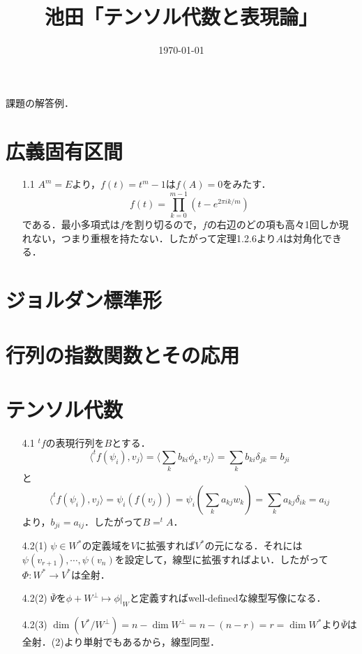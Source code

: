 \documentclass[a4paper,10pt,uplatex]{jsarticle}
\newcommand{\transpose}[1]{^t\! #1}
\numberwithin{equation}{section}
\theoremstyle{mystyle}
\begin{document}
\title{池田「テンソル代数と表現論」}
\author{}
\date{\today}
\maketitle

課題の解答例．
\section{広義固有区間}
\begin{itemize}
    \item[1.1] $A^m = E$より，$f(t) = t^m - 1$は$f(A) = 0$をみたす．
    \begin{equation}
        f(t) = \prod_{k=0}^{m-1}(t-e^{2\pi i k/m})
    \end{equation}
    である．最小多項式は$f$を割り切るので，$f$の右辺のどの項も高々1回しか現れない，つまり重根を持たない．したがって定理1.2.6より$A$は対角化できる．
\end{itemize}

\section{ジョルダン標準形}

\section{行列の指数関数とその応用}

\section{テンソル代数}
\begin{itemize}
    \item [4.1] $\transpose{f}$の表現行列を$B$とする．
    \begin{equation}
        \langle \transpose{f}(\psi_i),v_j \rangle = \langle \sum_{k} b_{ki}\phi_k, v_j \rangle = \sum_{k} b_{ki}\delta_{jk} = b_{ji}
    \end{equation}
    と
    \begin{equation}
        \langle \transpose{f}(\psi_i),v_j \rangle = \psi_i(f(v_j)) = \psi_i \left(\sum_{k} a_{kj} w_k\right) = \sum_{k} a_{kj}\delta_{ik} = a_{ij}
    \end{equation}
    より，$b_{ji} = a_{ij}$．したがって$B = \transpose{A}$．

    \item[4.2(1)] $\psi \in  W^*$の定義域を$V$に拡張すれば$V^*$の元になる．それには$\psi(v_{r+1}), \cdots, \psi(v_n)$を設定して，線型に拡張すればよい．したがって$\Phi : W^* \to V^*$は全射．
    \item[4.2(2)] $\bar{\Psi}$を$\phi + W^{\perp} \mapsto \phi|_W$と定義すればwell-definedな線型写像になる．
    \item[4.2(3)] $\dim (V^*/W^{\perp}) = n - \dim W^{\perp} = n - (n - r) = r = \dim W^*$より$\bar{\Psi}$は全射．(2)より単射でもあるから，線型同型．
\end{itemize}
\end{document}
